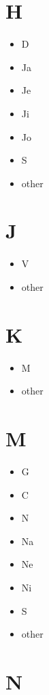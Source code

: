 \documentclass[
]{book}
\providecommand{\tightlist}{%
  \setlength{\itemsep}{0pt}\setlength{\parskip}{0pt}}
\begin{document}
\hypertarget{h}{%
\section{H}\label{h}}

\begin{itemize}
\tightlist
\item
  D
\item
  Ja
\item
  Je
\item
  Ji
\item
  Jo
\item
  S
\item
  other
\end{itemize}

\hypertarget{j}{%
\section{J}\label{j}}

\begin{itemize}
\tightlist
\item
  V
\item
  other
\end{itemize}

\hypertarget{k}{%
\section{K}\label{k}}

\begin{itemize}
\tightlist
\item
  M
\item
  other
\end{itemize}

\hypertarget{m}{%
\section{M}\label{m}}

\begin{itemize}
\tightlist
\item
  G
\item
  C
\item
  N
\item
  Na
\item
  Ne
\item
  Ni
\item
  S
\item
  other
\end{itemize}

\hypertarget{n}{%
\section{N}\label{n}}
\end{document}
